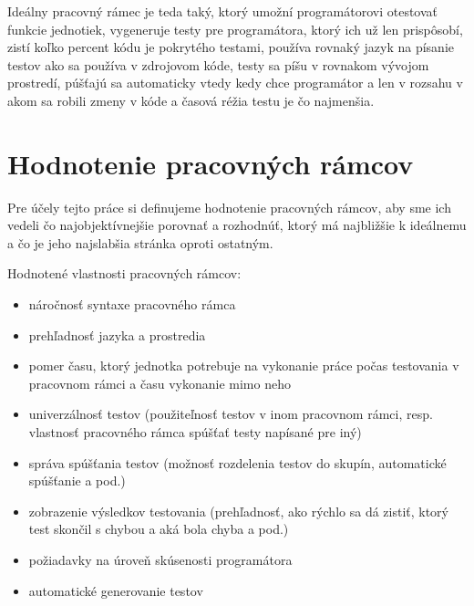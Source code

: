 \documentclass[11pt,twoside,slovak,a4paper]{article}
\begin{document}
		Ideálny pracovný rámec je teda taký, ktorý umožní programátorovi otestovať funkcie jednotiek, vygeneruje testy pre programátora, ktorý ich už len prispôsobí, zistí koľko percent kódu je pokrytého testami, používa rovnaký jazyk na písanie testov ako sa používa v zdrojovom kóde, testy sa píšu v rovnakom vývojom prostredí, púšťajú sa automaticky vtedy kedy chce programátor a len v rozsahu v akom sa robili zmeny v kóde a časová réžia testu je čo najmenšia.
	
	\newpage
	\thispagestyle{plain}
	\section{Hodnotenie pracovných rámcov}	
	Pre účely tejto práce si definujeme hodnotenie pracovných rámcov, aby sme ich vedeli čo najobjektívnejšie porovnať a rozhodnúť, ktorý má najbližšie k ideálnemu a čo je jeho najslabšia stránka oproti ostatným.
	
	Hodnotené vlastnosti pracovných rámcov:
	\begin{itemize}
		\item náročnosť syntaxe pracovného rámca
		\item prehľadnosť jazyka a prostredia
		\item pomer času, ktorý jednotka potrebuje na vykonanie práce počas testovania v pracovnom rámci a času vykonanie mimo neho
		\item univerzálnosť testov (použiteľnosť testov v inom pracovnom rámci, resp. vlastnosť pracovného rámca spúšťať testy napísané pre iný)
		\item správa spúšťania testov (možnosť rozdelenia testov do skupín, automatické spúšťanie a pod.)
		\item zobrazenie výsledkov testovania (prehľadnosť, ako rýchlo sa dá zistiť, ktorý test skončil s chybou a aká bola chyba a pod.)
		\item požiadavky na úroveň skúsenosti programátora
		\item automatické generovanie testov
	\end{itemize}
	
\end{document}
